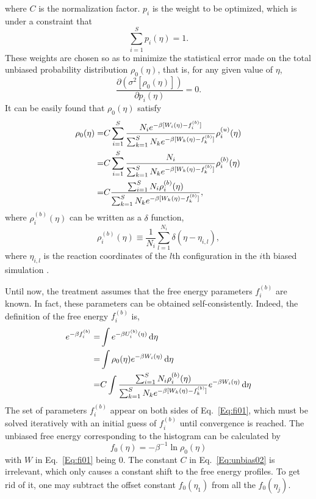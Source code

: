 where $C$ is the normalization factor. $p_i$ is the weight to be optimized, which is under a constraint that
\begin{equation}
\sum_{i=1}^{S}p_{i}(\eta)=1.
\label{Eq:p1}
\end{equation}
These weights are chosen so as to minimize the statistical error made on the total unbiased probability distribution $\rho_{0}(\eta)$, that is, for any given value of $\eta$,
\begin{equation}
\frac{\partial(\sigma^2[\rho_{0}(\eta)])}{\partial p_{i}(\eta)}=0.
\label{Eq:partialp}
\end{equation} 
It can be easily found that $\rho_{0}(\eta)$ satisfy
\begin{align}
\rho_{0}(\eta) = & C\sum_{i=1}^{S}\frac{N_{i}e^{-\beta[W_{i}(\eta)-f_{i}^{(b)}]}}{\sum_{k=1}^{S}N_{k}e^{-\beta[W_{k}(\eta)-f_{k}^{(b)}]}}\rho_{i}^{(u)}(\eta) \notag\\
= & C\sum_{i=1}^{S}\frac{N_{i}}{\sum_{k=1}^{S}N_{k}e^{-\beta[W_{k}(\eta)-f_{k}^{(b)}]}}\rho_{i}^{(b)}(\eta) \notag\\
= & C\frac{\sum_{i=1}^{S}N_{i}\rho_{i}^{(b)}(\eta)}{\sum_{k=1}^{S}N_{k}e^{-\beta[W_{k}(\eta)-f_{k}^{(b)}]}},
\label{Eq:unbias02}
\end{align} 
where $\rho_{i}^{(b)}(\eta)$ can be written as a $\delta$ function,
\begin{equation}
\rho_{i}^{(b)}(\eta) \equiv \frac{1}{N_{i}} \sum_{l=1}^{N_{i}} \delta {(\eta-\eta_{i,l})},
\label{Eq:delta01}
\end{equation} 
where $\eta_{i,l}$ is the reaction coordinates of the $l$th configuration in the $i$th biased simulation .

Until now, the treatment assumes that the free energy parameters ${f_{i}^{(b)}}$ are known. In fact, these parameters can be obtained self-consistently. Indeed, the definition of the free energy $f_{i}^{(b)}$ is,
\begin{align}
e^{-\beta f_{i}^{(b)}}=&\int e^{-\beta U_{i}^{(b)}(\eta) } \mathop{}\!\mathrm{d}\eta \notag\\
=&\int \rho_{0}(\eta) e^{-\beta W_{i}(\eta)} \mathop{}\!\mathrm{d}\eta \notag\\
=&C \int \frac{\sum_{i=1}^{S}N_{i}\rho_{i}^{(b)}(\eta)}{\sum_{k=1}^{S}N_{k}e^{-\beta[W_{k}(\eta)-f_{k}^{(b)}]}}e^{-\beta W_{i}(\eta)}  \mathop{}\!\mathrm{d}\eta
\label{Eq:fi01}
\end{align} 
The set of parameters ${f_{i}^{(b)}}$ appear on both sides of Eq.~\ref{Eq:fi01}, which must be solved iteratively with an initial guess of ${f_{i}^{(b)}}$ until convergence is reached. The unbiased free energy corresponding to the histogram can be calculated by
\begin{equation}
f_{0}(\eta)=-\beta^{-1}\ln \rho_{0}(\eta) 
\label{Eq:f0}
\end{equation}
with $W$ in Eq.~\ref{Eq:fi01} being 0.
The constant $C$ in Eq.~\ref{Eq:unbias02} is irrelevant, which only causes a constant shift to the free energy profiles. To get rid of it, one may subtract the offset constant $f_{0}(\eta_{1})$ from all the $f_{0}(\eta_{j})$.  

